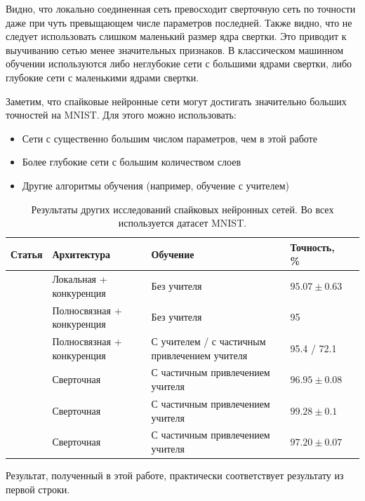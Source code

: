 \documentclass[a4paper]{article}
\begin{document}

Видно, что локально соединенная сеть превосходит сверточную сеть по точности даже при чуть превыщающем числе параметров последней. Также видно, что не следует использовать слишком маленький размер ядра свертки. Это приводит к выучиванию сетью менее значительных признаков. В классическом машинном обучении используются либо неглубокие сети с большими ядрами свертки, либо глубокие сети с маленькими ядрами свертки.

Заметим, что спайковые нейронные сети могут достигать значительно больших точностей на MNIST. Для этого можно использовать:
\begin{itemize}
\item Сети с существенно большим числом параметров, чем в этой работе
\item Более глубокие сети с большим количеством слоев
\item Другие алгоритмы обучения (например, обучение с учителем)
\end{itemize}

\begin{table}[H]
 \caption{Результаты других исследований спайковых нейронных сетей. Во всех используется датасет MNIST.}
\begin{center}
\begin{tabular}{|l|p{4cm}|p{7cm}|l|l|}
\hline
Статья & Архитектура & Обучение & Точность, \% \\
\hline
{\cite{saunders2019locally}} & {Локальная + конкуренция} & {Без учителя} & {$95.07 \pm 0.63$}\\
\hline
{\cite{mnist1}} & {Полносвязная + конкуренция} & {Без учителя} & {95}\\
\hline
{\cite{MaxActiv1}} & {Полносвязная + конкуренция} & {С учителем / с частичным привлечением учителя} & {95.4 / 72.1}\\
\hline
{\cite{conv1}} & {Сверточная} & {С частичным привлечением учителя} & {$96.95 \pm 0.08$}\\
\hline
{\cite{conv2}} & {Сверточная} & {С частичным привлечением учителя} & {$99.28 \pm 0.1$}\\
\hline
{\cite{conv3}} & {Сверточная} & {С частичным привлечением учителя} & {$97.20 \pm 0.07$}\\
\hline
\end{tabular}
\end{center}
\end{table}

Результат, полученный в этой работе, практически соответствует результату из первой строки.
\end{document}
